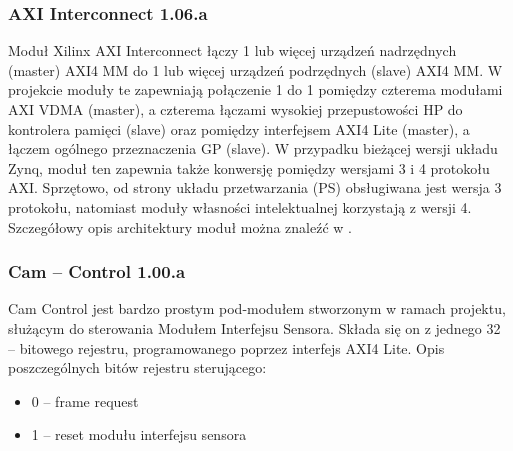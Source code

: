 \documentclass[a4paper,11pt,oneside]{report}  %
\begin{document}
\subsubsection{AXI Interconnect 1.06.a}
Moduł Xilinx AXI Interconnect łączy 1 lub więcej urządzeń nadrzędnych (master) AXI4 MM do 1 lub więcej urządzeń podrzędnych (slave) AXI4 MM. W projekcie moduły te zapewniają połączenie 1 do 1 pomiędzy czterema modułami AXI VDMA (master), a czterema łączami wysokiej przepustowości HP do kontrolera pamięci (slave) oraz pomiędzy interfejsem AXI4 Lite (master), a łączem ogólnego przeznaczenia GP (slave). W przypadku bieżącej wersji układu Zynq, moduł ten zapewnia także konwersję pomiędzy wersjami 3 i 4 protokołu AXI. Sprzętowo, od strony układu przetwarzania (PS) obsługiwana jest wersja 3 protokołu, natomiast moduły własności intelektualnej korzystają z wersji 4. Szczegółowy opis architektury moduł można znaleźć w \cite{5}.

\subsubsection{Cam – Control 1.00.a}
Cam Control jest bardzo prostym pod-modułem stworzonym w ramach projektu, służącym do sterowania Modułem Interfejsu Sensora. Składa się on z jednego 32 – bitowego rejestru, programowanego poprzez interfejs AXI4 Lite. Opis poszczególnych bitów rejestru sterującego: 
\begin{itemize}
\item 0 – frame request
\item 1 – reset modułu interfejsu sensora
\end{itemize}
 
\end{document}
